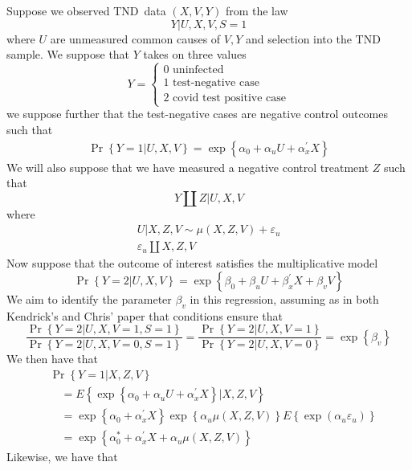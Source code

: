 \documentclass[12pt]{article}
\begin{document}
Suppose we observed TND\ data $(X,V,Y)$ from the law 
\[
Y|U,X,V,S=1
\]
where $U$ are unmeasured common causes of $V, Y$ and selection into the TND
sample. We suppose that $Y$ takes on three values 
\[
Y=\left\{ 
\begin{array}{c}
0\text{ uninfected } \\ 
1\text{ test-negative case} \\ 
2\text{ covid test positive case}%
\end{array}%
\right. 
\]%
we suppose further that the test-negative cases are negative control
outcomes such that 
\begin{eqnarray*}
\Pr \left\{ Y=1|U,X,V\right\} = \exp \left\{ \alpha _{0}+\alpha _{u}U+\alpha _{x}^{\prime }X\right\} 
\end{eqnarray*}%
We will also suppose that we have measured a negative control treatment $Z$
such that%
\[
Y\amalg Z|U,X,V
\]
where  
\begin{gather*}
U|X,Z,V\sim \mu \left( X,Z,V\right) +\varepsilon _{u} \\
\varepsilon_{u} \amalg X,Z,V
\end{gather*}%
Now suppose that the outcome of interest satisfies the multiplicative model 
\[
\Pr \left\{ Y=2|U,X,V\right\} =\exp \left\{ \beta _{0} + \beta
_{u}U+\beta _{x}^{\prime }X +\beta _{v}V\right\} 
\]%
We aim to identify the parameter $\beta _{v}$ in this regression, assuming
as in both Kendrick's and Chris' paper that conditions ensure that%
\[
\frac{\Pr \left\{ Y=2|U,X,V=1,S=1\right\} }{\Pr \left\{
Y=2|U,X,V=0,S=1\right\} }=\frac{\Pr \left\{ Y=2|U,X,V=1\right\} }{\Pr
\left\{ Y=2|U,X,V=0\right\} }=\exp \left\{ \beta _{v}\right\} 
\]
We then have that 
\begin{align*}
&\Pr \left\{ Y=1 | X,Z,V \right\}  \\
&\quad=E\left\{ \exp \left\{ \alpha _{0}+\alpha _{u}U+\alpha _{x}^{\prime
}X\right\} | X, Z, V\right\}  \\
&\quad =\exp \left\{ \alpha _{0}+\alpha _{x}^{\prime }X\right\} \exp \left\{
\alpha _{u}\mu \left( X,Z,V \right) \right\} E\left\{ \exp \left( \alpha
_{u}\varepsilon _{u}\right) \right\}  \\
&\quad =\exp \left\{ \alpha _{0}^{\ast }+\alpha _{x}^{\prime }X+\alpha _{u}\mu
\left( X,Z,V \right) \right\} 
\end{align*}%
Likewise, we have that 
\end{document}
